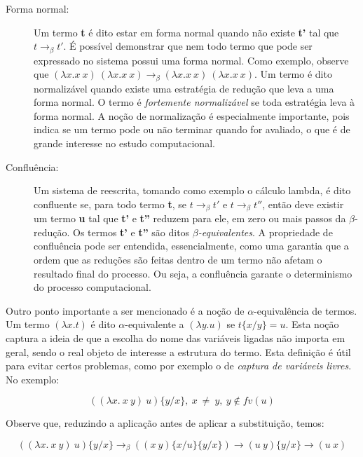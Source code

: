 \begin{description}
    \item[Forma normal:] Um termo \textbf{t} é dito estar em forma
    normal quando não existe \textbf{t'} tal que $ t \rightarrow_\beta t' $. 
    É possível demonstrar que nem todo termo que pode ser expressado no sistema
    possui uma forma normal. Como exemplo, observe que $ (\lambda x.x\ x)\ (\lambda
    x.x\ x) \rightarrow_\beta (\lambda x.x\ x)\ (\lambda x.x\ x) $. Um termo é
    dito normalizável quando existe uma estratégia de redução que leva a uma
    forma normal. O termo é \emph{fortemente normalizável} se toda estratégia
    leva à forma normal. A noção de normalização é especialmente importante,
    pois indica se um termo pode ou não terminar quando for avaliado, o que é de
    grande interesse no estudo computacional.

    \item[Confluência:] Um sistema de reescrita, tomando como exemplo o cálculo
    lambda, é dito confluente se, para todo termo \textbf{t}, se $ t
    \rightarrow_\beta t' $ e $ t \rightarrow_\beta t'' $, então deve existir
    um termo \textbf{u} tal que \textbf{t'} e \textbf{t''} reduzem para ele,
    em zero ou mais passos da $\beta$-redução.  Os termos \textbf{t'} e
    \textbf{t''} são ditos \textit{$\beta$-equivalentes}.  A propriedade de
    confluência pode ser entendida, essencialmente, como uma garantia que a
    ordem que as reduções são feitas dentro de um termo não afetam o
    resultado final do processo. Ou seja, a confluência garante o determinismo
    do processo computacional.
\end{description}

Outro ponto importante a ser mencionado é a noção de $\alpha$-equivalência de
termos. Um termo $(\lambda x. t)$ é dito $\alpha$-equivalente a $(\lambda y. u)$
se $ t\{x/y\} = u $. Esta noção captura a ideia de que a escolha do nome das
variáveis ligadas não importa em geral, sendo o real objeto de interesse a
estrutura do termo. Esta definição é útil para evitar certos problemas, como por
exemplo o de \textit{captura de variáveis livres}. No exemplo:

\[ ((\lambda x.\ x\ y)\ u)\{y/x\},\ x\ \neq\ y,\ y  \notin fv(u) \]

Observe que, reduzindo a aplicação antes de aplicar a substituição, temos:


\[ ((\lambda x.\ x\ y)\ u)\{y/x\} \rightarrow_\beta ((x\ y)\{x/u\}\{y/x\})
\rightarrow (u\ y)\{y/x\} \rightarrow (u\ x) \]

